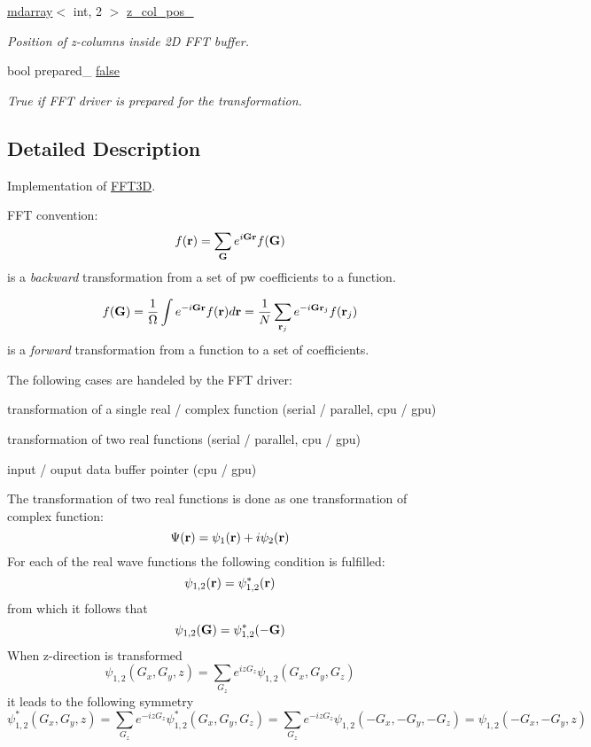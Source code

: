 \begin{DoxyCompactItemize}
\item 
\hyperlink{classsddk_1_1mdarray}{mdarray}$<$ int, 2 $>$ \hyperlink{classsddk_1_1_f_f_t3_d_aa62fe8604ebdf4b5759f945673076b39}{z\+\_\+col\+\_\+pos\+\_\+}
\begin{DoxyCompactList}\small\item\em Position of z-\/columns inside 2\+D F\+F\+T buffer. \end{DoxyCompactList}\item 
bool prepared\+\_\+ \hyperlink{classsddk_1_1_f_f_t3_d_a03b624e27a337aa492f000b58b905ca9}{false}
\begin{DoxyCompactList}\small\item\em True if F\+F\+T driver is prepared for the transformation. \end{DoxyCompactList}\end{DoxyCompactItemize}


\subsection{Detailed Description}
Implementation of \hyperlink{classsddk_1_1_f_f_t3_d}{F\+F\+T3\+D}. 

F\+F\+T convention\+: \[ f({\bf r}) = \sum_{{\bf G}} e^{i{\bf G}{\bf r}} f({\bf G}) \] is a {\itshape backward} transformation from a set of pw coefficients to a function.

\[ f({\bf G}) = \frac{1}{\Omega} \int e^{-i{\bf G}{\bf r}} f({\bf r}) d {\bf r} = \frac{1}{N} \sum_{{\bf r}_j} e^{-i{\bf G}{\bf r}_j} f({\bf r}_j) \] is a {\itshape forward} transformation from a function to a set of coefficients.

The following cases are handeled by the F\+F\+T driver\+:
\begin{DoxyItemize}
\item transformation of a single real / complex function (serial / parallel, cpu / gpu)
\item transformation of two real functions (serial / parallel, cpu / gpu)
\item input / ouput data buffer pointer (cpu / gpu)
\end{DoxyItemize}

The transformation of two real functions is done as one transformation of complex function\+: \[ \Psi({\bf r}) = \psi_1({\bf r}) + i \psi_2({\bf r}) \] For each of the real wave functions the following condition is fulfilled\+: \[ \psi_{1,2}({\bf r}) = \psi_{1,2}^{*}({\bf r}) \] from which it follows that \[ \psi_{1,2}({\bf G}) = \psi_{1,2}^{*}(-{\bf G}) \] When z-\/direction is transformed \[ \psi_{1,2}(G_x, G_y, z) = \sum_{G_z} e^{izG_z} \psi_{1,2}(G_x, G_y, G_z) \] it leads to the following symmetry \[ \psi_{1,2}^{*}(G_x, G_y, z) = \sum_{G_z} e^{-izG_z} \psi_{1,2}^{*}(G_x, G_y, G_z) = \sum_{G_z} e^{-izG_z} \psi_{1,2}(-G_x, -G_y, -G_z) = \psi_{1,2}(-G_x, -G_y, z) \] 

